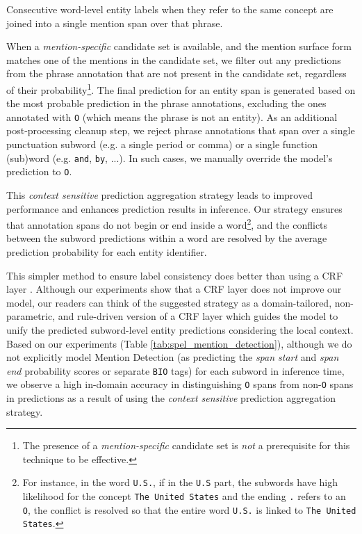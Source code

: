 \documentclass[11pt]{article}
\begin{document}
Consecutive word-level entity labels when they refer to the same concept are joined into a single mention span over that phrase. 

When a \textit{mention-specific} candidate set is available, and the mention surface form matches one of the mentions in the candidate set, we filter out any predictions from the phrase annotation that are not present in the candidate set, regardless of their probability\footnote{The presence of a \textit{mention-specific} candidate set is \textit{not} a prerequisite for this technique to be effective.}. The final prediction for an entity span is generated based on the most probable prediction in the phrase annotations, excluding the ones annotated with \texttt{O} (which means the phrase is not an entity). As an additional post-processing cleanup step, we reject phrase annotations that span over a single punctuation subword (e.g. a single period or comma) or a single function (sub)word (e.g. \texttt{and}, \texttt{by}, ...). In such cases, we manually override the model's prediction to \texttt{O}. 

This \textit{context sensitive} prediction aggregation strategy leads to improved performance and enhances prediction results in inference. Our strategy ensures that annotation spans do not begin or end inside a word\footnote{For instance, in the word \texttt{U.S.}, if in the \texttt{U.S} part, the subwords have high likelihood for the concept \texttt{The United States} and the ending \texttt{.} refers to an \texttt{O}, the conflict is resolved so that the entire word \texttt{U.S.} is linked to \texttt{The United States}.}, and the conflicts between the subword predictions within a word are resolved by the average prediction probability for each entity identifier. 

This simpler method to ensure label consistency does better than using a CRF layer \cite{CRF}. 
Although our experiments show that a CRF layer does not improve our model, our readers can think of the suggested strategy as a domain-tailored, non-parametric, and rule-driven version of a CRF layer which guides the model to unify the predicted subword-level entity predictions considering the local context. 
Based on our experiments (Table \ref{tab:spel_mention_detection}), although we do not explicitly model Mention Detection (as predicting the \textit{span start} and \textit{span end} probability scores or separate \texttt{BIO} tags) for each subword in inference time, we observe a high in-domain accuracy in distinguishing \texttt{O} spans from non-\texttt{O} spans in predictions as a result of using the \textit{context sensitive} prediction aggregation strategy.
\end{document}
